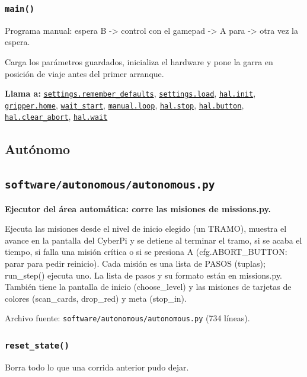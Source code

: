 \subsubsection{\texttt{main()}}\label{fn:rover_x_manual:main}
\noindent Programa manual: espera B -> control con el gamepad -> A para -> otra vez la espera.

Carga los parámetros guardados, inicializa el hardware y pone la garra en posición de viaje antes del primer arranque.

\noindent\textbf{Llama a:} \hyperref[fn:settings:remember-defaults]{\texttt{settings.remember\_\allowbreak{}defaults}}, \hyperref[fn:settings:load]{\texttt{settings.load}}, \hyperref[fn:hal:init]{\texttt{hal.init}}, \hyperref[fn:gripper:home]{\texttt{gripper.home}}, \hyperref[fn:rover_x_manual:wait-start]{\texttt{wait\_\allowbreak{}start}}, \hyperref[fn:manual:loop]{\texttt{manual.loop}}, \hyperref[fn:hal:stop]{\texttt{hal.stop}}, \hyperref[fn:hal:button]{\texttt{hal.button}}, \hyperref[fn:hal:clear-abort]{\texttt{hal.clear\_\allowbreak{}abort}}, \hyperref[fn:hal:wait]{\texttt{hal.wait}}\par

\subsection*{Autónomo}
\subsection{\texttt{software/autonomous/autonomous.py}}\label{mod:autonomous}
\textbf{Ejecutor del área automática: corre las misiones de missions.py.}

Ejecuta las misiones desde el nivel de inicio elegido (un TRAMO), muestra el avance en la pantalla del CyberPi y se detiene al terminar el tramo, si se acaba el tiempo, si falla una misión crítica o si se presiona A (cfg.ABORT\_BUTTON: parar para pedir reinicio). Cada misión es una lista de PASOS (tuplas); run\_step() ejecuta uno. La lista de pasos y su formato están en missions.py. También tiene la pantalla de inicio (choose\_level) y las misiones de tarjetas de colores (scan\_cards, drop\_red) y meta (stop\_in).

\noindent Archivo fuente: \texttt{software/autonomous/autonomous.py} (734 l\'ineas).

\subsubsection{\texttt{reset\_\allowbreak{}state()}}\label{fn:autonomous:reset-state}
\noindent Borra todo lo que una corrida anterior pudo dejar.

